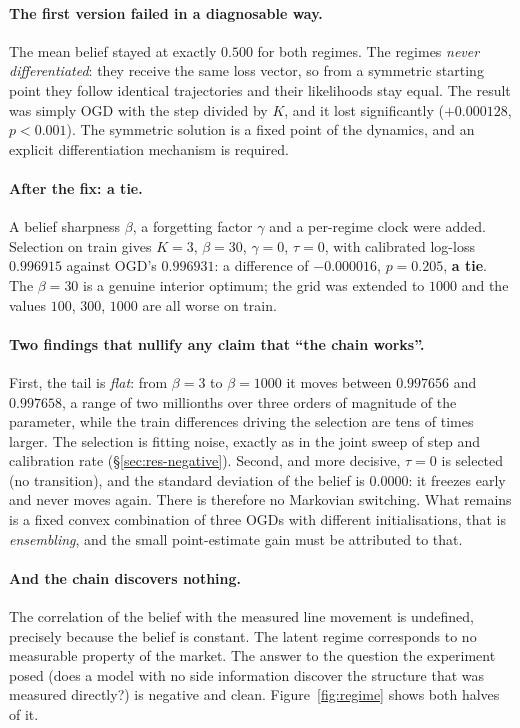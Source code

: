 \documentclass[12pt,a4paper,oneside]{report}
\renewcommand{\_}{\oldunderscore\allowbreak}
\theoremstyle{definition}
\theoremstyle{plain}
\theoremstyle{definition}   %
\begin{document}
\paragraph{The first version failed in a diagnosable way.} The mean belief stayed at exactly
$0.500$ for both regimes. The regimes \emph{never differentiated}: they receive the same loss
vector, so from a symmetric starting point they follow identical trajectories and their
likelihoods stay equal. The result was simply OGD with the step divided by $K$, and it lost
significantly ($+0.000128$, $p<0.001$). The symmetric solution is a fixed point of the dynamics,
and an explicit differentiation mechanism is required.

\paragraph{After the fix: a tie.} A belief sharpness $\beta$, a forgetting factor $\gamma$ and a
per-regime clock were added. Selection on train gives $K=3$, $\beta=30$, $\gamma=0$, $\tau=0$,
with calibrated log-loss $0.996915$ against OGD's $0.996931$: a difference of $-0.000016$,
$p=0.205$, \textbf{a tie}. The $\beta=30$ is a genuine interior optimum; the grid was extended
to $1000$ and the values $100$, $300$, $1000$ are all worse on train.

\paragraph{Two findings that nullify any claim that ``the chain works''.} First, the tail is
\emph{flat}: from $\beta=3$ to $\beta=1000$ it moves between $0.997656$ and $0.997658$, a range of
two millionths over three orders of magnitude of the parameter, while the train differences
driving the selection are tens of times larger. The selection is fitting noise, exactly as in the
joint sweep of step and calibration rate (\S\ref{sec:res-negative}). Second, and more decisive,
$\tau=0$ is selected (no transition), and the standard deviation of the belief is $0.0000$: it
freezes early and never moves again. There is therefore no Markovian switching. What remains is
a fixed convex combination of three OGDs with different initialisations, that is
\emph{ensembling}, and the small point-estimate gain must be attributed to that.

\paragraph{And the chain discovers nothing.} The correlation of the belief with the measured line
movement is undefined, precisely because the belief is constant. The latent regime corresponds to
no measurable property of the market. The answer to the question the experiment posed (does a
model with no side information discover the structure that was measured directly?) is negative
and clean. Figure~\ref{fig:regime} shows both halves of it.
\end{document}
